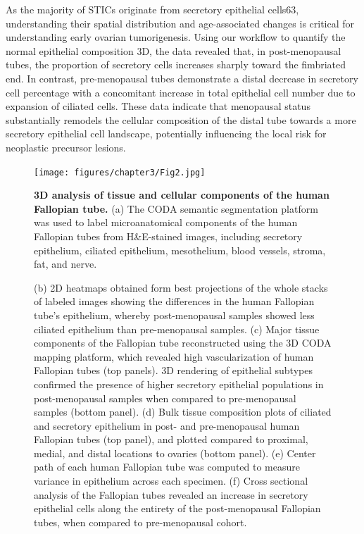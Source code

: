 \begin{refsection}
    As the majority of STICs originate from secretory epithelial cells63, understanding their spatial distribution and age-associated changes is critical for understanding early ovarian tumorigenesis. Using our workflow to quantify the normal epithelial composition 3D, the data revealed that, in post-menopausal tubes, the proportion of secretory cells increases sharply toward the fimbriated end. In contrast, pre-menopausal tubes demonstrate a distal decrease in secretory cell percentage with a concomitant increase in total epithelial cell number due to expansion of ciliated cells. These data indicate that menopausal status substantially remodels the cellular composition of the distal tube towards a more secretory epithelial cell landscape, potentially influencing the local risk for neoplastic precursor lesions.

    \begin{figure}[p]
        \begin{center}
            \texttt{[image: figures/chapter3/Fig2.jpg]}
            \captionsetup{font=small}
            \caption{\textbf{3D analysis of tissue and cellular components of the human Fallopian tube.} (a) The CODA semantic segmentation platform was used to label microanatomical components of the human Fallopian tubes from H\&E-stained images, including secretory epithelium, ciliated epithelium, mesothelium, blood vessels, stroma, fat, and nerve.}
            \label{chapter3_fig2}
        \end{center}
    \end{figure}
    
    \begin{figure}[h!]
        \ContinuedFloat
        \captionsetup{font=small}
        \caption[]{(b) 2D heatmaps obtained form best projections of the whole stacks of labeled images showing the differences in the human Fallopian tube’s epithelium, whereby post-menopausal samples showed less ciliated epithelium than pre-menopausal samples. (c) Major tissue components of the Fallopian tube reconstructed using the 3D CODA mapping platform, which revealed high vascularization of human Fallopian tubes (top panels). 3D rendering of epithelial subtypes confirmed the presence of higher secretory epithelial populations in post-menopausal samples when compared to pre-menopausal samples (bottom panel). (d) Bulk tissue composition plots of ciliated and secretory epithelium in post- and pre-menopausal human Fallopian tubes (top panel), and plotted compared to proximal, medial, and distal locations to ovaries (bottom panel). (e) Center path of each human Fallopian tube was computed to measure variance in epithelium across each specimen. (f) Cross sectional analysis of the Fallopian tubes revealed an increase in secretory epithelial cells along the entirety of the post-menopausal Fallopian tubes, when compared to pre-menopausal cohort.}
    \end{figure}


\end{refsection}
